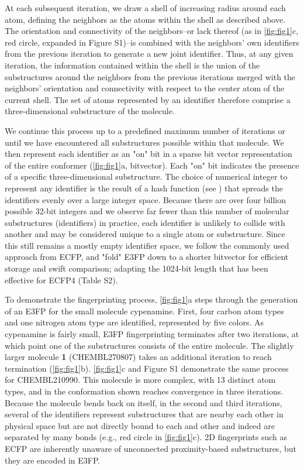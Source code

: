 \documentclass[../main.tex]{subfiles}
\begin{document}
\begin{refsection}
At each subsequent iteration, we draw a shell of increasing radius around each atom, defining the neighbors as the atoms within the shell as described above.
The orientation and connectivity of the neighbors--or lack thereof (as in \cref{fig:fig1}c, red circle, expanded in Figure S1)--is combined with the neighbors' own identifiers from the previous iteration to generate a new joint identifier.
Thus, at any given iteration, the information contained within the shell is the union of the substructures around the neighbors from the previous iterations merged with the neighbors' orientation and connectivity with respect to the center atom of the current shell.
The set of atoms represented by an identifier therefore comprise a three-dimensional substructure of the molecule.

We continue this process up to a predefined maximum number of iterations or until we have encountered all substructures possible within that molecule.
We then represent each identifier as an "on" bit in a sparse bit vector representation of the entire conformer (\cref{fig:fig1}a, bitvector).
Each "on" bit indicates the presence of a specific three-dimensional substructure.
The choice of numerical integer to represent any identifier is the result of a hash function (see  ) that spreads the identifiers evenly over a large integer space.
Because there are over four billion possible 32-bit integers and we observe far fewer than this number of molecular substructures (identifiers) in practice, each identifier is unlikely to collide with another and may be considered unique to a single atom or substructure.
Since this still remains a mostly empty identifier space, we follow the commonly used approach from ECFP, and "fold" E3FP down to a shorter bitvector for efficient storage and swift comparison; adapting the 1024-bit length that has been effective for ECFP4  \cite{hert_2008,hert_2004} (Table S2).

To demonstrate the fingerprinting process, \cref{fig:fig1}a steps through the generation of an E3FP for the small molecule cypenamine.
First, four carbon atom types and one nitrogen atom type are identified, represented by five colors.
As cypenamine is fairly small, E3FP fingerprinting terminates after two iterations, at which point one of the substructures consists of the entire molecule.
The slightly larger molecule \textbf{1} (CHEMBL270807) takes an additional iteration to reach termination  (\cref{fig:fig1}b).
\cref{fig:fig1}c and Figure S1 demonstrate the same process for CHEMBL210990.
This molecule is more complex, with 13 distinct atom types, and in the conformation shown reaches convergence in three iterations.
Because the molecule bends back on itself, in the second and third iterations, several of the identifiers represent substructures that are nearby each other in physical space but are not directly bound to each and other and indeed are separated by many bonds (e.g., red circle in \cref{fig:fig1}c).
2D fingerprints such as ECFP are inherently unaware of unconnected proximity-based substructures, but they are encoded in E3FP.
 


\end{refsection}
\end{document}
